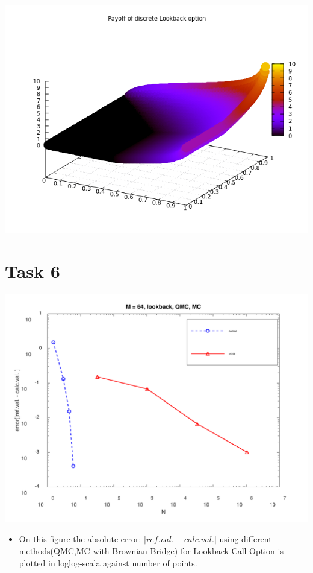 \documentclass[10pt,a4paper]{article}
\begin{document}
\begin{center}
	\includegraphics[scale=0.4]{payoff_lookback.png}
\end{center}

\section*{Task 6}

\begin{center}
	\includegraphics[scale=0.3]{images/task6_error.png}
\end{center}
\begin{itemize}
    \item{
        On this figure the absolute error: $|ref.val.-calc.val.|$ using different methods(QMC,MC with Brownian-Bridge) for Lookback Call Option is plotted in loglog-scala against number of points.
        
    }
     
\end{itemize}
\end{document}
